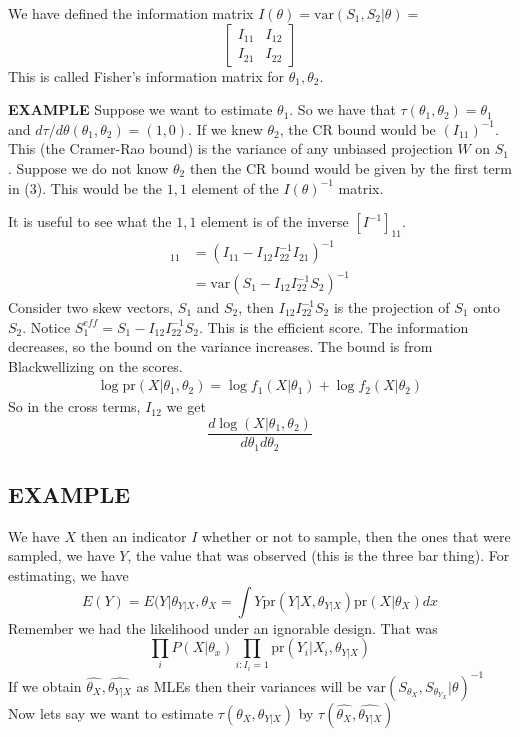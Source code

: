 \documentclass[letterpaper, 12pt]{article}
\theoremstyle{definition}
\theoremstyle{plain}
\newcommand{\var}{\text{var}}
\newcommand{\pr}{\text{pr}}
\begin{document}
We have defined the information matrix $I(\theta) = \var(S_1, S_2 | \theta) = $
\begin{equation}
\begin{bmatrix}
I_{11} & I_{12} \\
I_{21} & I_{22}
\end{bmatrix}
\end{equation}
This is called Fisher's information matrix for $\theta_1, \theta_2$.

\textbf{EXAMPLE} Suppose we want to estimate $\theta_1$. So we have that $\tau(\theta_1, \theta_2) = \theta_1$ and $d \tau / d \theta (\theta_1, \theta_2) = (1, 0)$. If we knew $\theta_2$, the CR bound would be $(I_{11}) ^{-1}$. This (the Cramer-Rao bound) is the variance of any unbiased projection $W$ on $S_1$. Suppose we do not know $\theta_2$ then the CR bound would be given by the first term in (3). This would be the $1,1$ element of the $I(\theta)^{-1}$ matrix.

It is useful to see what the $1,1$ element is of the inverse $[I^{-1}]_{11}$.
\begin{align}
[I^{-1}(\theta)]_{11} &= (I_{11} - I_{12} I_{22}^{-1} I_{21}) ^{-1} \\
&= \var(S_1 - I_{12}I_{22}^{-1} S_2)^{-1}
\end{align}
Consider two skew vectors, $S_1$ and $S_2$, then $I_{12} I_{22}^{-1} S_2$ is the projection of $S_1$ onto $S_2$. Notice $S_1 ^{eff} = S_1 - I_{12} I_{22}^{-1} S_2$. This is the efficient score. The information decreases, so the bound on the variance increases. The bound is from Blackwellizing on the scores.
\begin{align}
\log \pr (X | \theta_1, \theta_2) = \log f_1 (X | \theta_1) + \log f_2 (X | \theta_2)
\end{align}
So in the cross terms, $I_{12}$ we get 
\begin{equation}
\frac{d \log (X | \theta_1, \theta_2)}{d \theta_1 d \theta_2}
\end{equation}
\subsection*{EXAMPLE}
We have $X$ then an indicator $I$ whether or not to sample, then the ones that were sampled, we have $Y$, the value that was observed (this is the three bar thing). For estimating, we have 
\[
E(Y) 
= E (Y | \theta_{Y | X}, \theta_X
= \int Y \pr (Y | X, \theta_{Y | X}) \pr (X | \theta_X) dx
\]
Remember we had the likelihood under an ignorable design. That was 
\begin{equation}
\prod _ {i} P(X | \theta_x) \prod_{i : I_i = 1} \pr( Y_i | X_i, \theta_{Y|X})
\end{equation}
If we obtain $\hat{\theta_X}, \hat{\theta_{Y|X}}$ as MLEs then their variances will be $\var( S_{\theta_X}, S_{\theta_{Y_X}} | \theta) ^{-1}$
Now lets say we want to estimate 
$\tau (\theta_X, \theta_{Y|X})$ by
$\tau (\hat{\theta_X}, \hat{\theta_{Y|X}})$
\end{document}
